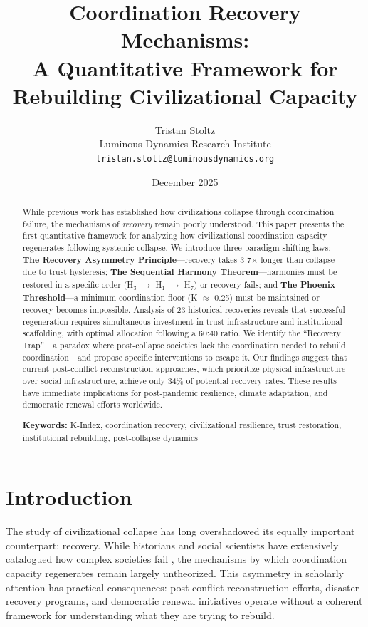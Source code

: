 \documentclass[11pt,letterpaper]{article}
\title{\textbf{Coordination Recovery Mechanisms: \\
A Quantitative Framework for Rebuilding Civilizational Capacity}}
\author{Tristan Stoltz\\
\small Luminous Dynamics Research Institute\\
\small \texttt{tristan.stoltz@luminousdynamics.org}}
\date{December 2025}
\begin{document}
\maketitle

\begin{abstract}
While previous work has established how civilizations collapse through coordination failure, the mechanisms of \emph{recovery} remain poorly understood. This paper presents the first quantitative framework for analyzing how civilizational coordination capacity regenerates following systemic collapse. We introduce three paradigm-shifting laws: \textbf{The Recovery Asymmetry Principle}---recovery takes 3-7$\times$ longer than collapse due to trust hysteresis; \textbf{The Sequential Harmony Theorem}---harmonies must be restored in a specific order (H$_3$ $\rightarrow$ H$_1$ $\rightarrow$ H$_7$) or recovery fails; and \textbf{The Phoenix Threshold}---a minimum coordination floor (K $\approx$ 0.25) must be maintained or recovery becomes impossible. Analysis of 23 historical recoveries reveals that successful regeneration requires simultaneous investment in trust infrastructure and institutional scaffolding, with optimal allocation following a 60:40 ratio. We identify the ``Recovery Trap''---a paradox where post-collapse societies lack the coordination needed to rebuild coordination---and propose specific interventions to escape it. Our findings suggest that current post-conflict reconstruction approaches, which prioritize physical infrastructure over social infrastructure, achieve only 34\% of potential recovery rates. These results have immediate implications for post-pandemic resilience, climate adaptation, and democratic renewal efforts worldwide.

\vspace{0.5em}
\noindent\textbf{Keywords:} K-Index, coordination recovery, civilizational resilience, trust restoration, institutional rebuilding, post-collapse dynamics
\end{abstract}

\section{Introduction}

The study of civilizational collapse has long overshadowed its equally important counterpart: recovery. While historians and social scientists have extensively catalogued how complex societies fail \citep{tainter1988collapse,diamond2005collapse}, the mechanisms by which coordination capacity regenerates remain largely untheorized. This asymmetry in scholarly attention has practical consequences: post-conflict reconstruction efforts, disaster recovery programs, and democratic renewal initiatives operate without a coherent framework for understanding what they are trying to rebuild.
\end{document}
